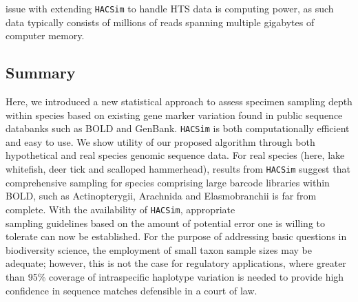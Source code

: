 issue with extending {\tt HACSim} to handle HTS data is computing power, as such data typically consists of millions of reads spanning multiple gigabytes of computer memory.



\subsection{Summary}

Here, we introduced a new statistical approach to assess specimen sampling depth within species based on existing gene marker variation found in public sequence databanks such as BOLD and GenBank. {\tt HACSim} is both computationally efficient and easy to use. We show utility of our proposed algorithm through both hypothetical and real species genomic sequence data. For real species (here, lake whitefish, deer tick and scalloped hammerhead), results from {\tt HACSim} suggest that comprehensive sampling for species comprising large barcode libraries within BOLD, such as Actinopterygii, Arachnida and Elasmobranchii is far from complete. With the availability of {\tt HACSim}, appropriate \\ sampling guidelines based on the amount of potential error one is willing to tolerate can now be established. For the purpose of addressing basic questions in biodiversity science, the employment of small taxon sample sizes may be adequate; however, this is not the case for regulatory applications, where greater than 95\% coverage of intraspecific haplotype variation is needed to provide high confidence in sequence matches defensible in a court of law.

     

